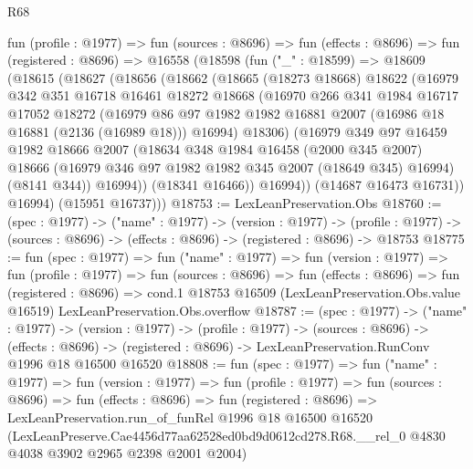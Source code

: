 \begin{lexlean}{R68}
\begin{coremodule}
  fun (profile : @1977) =>
  fun (sources : @8696) =>
  fun (effects : @8696) =>
  fun (registered : @8696) =>
  @16558
    (@18598
      (fun ("_" : @18599) =>
      @18609
        (@18615
          (@18627
            (@18656
              (@18662
                (@18665
                  (@18273 @18668)
                  @18622
                  (@16979
                    @342
                    @351
                    @16718
                    @16461
                    @18272
                    @18668
                    (@16970
                      @266
                      @341
                      @1984
                      @16717
                      @17052
                      @18272
                      (@16979
                        @86
                        @97
                        @1982
                        @1982
                        @16881
                        @2007
                        (@16986 @18 @16881 (@2136 (@16989 @18)))
                        @16994)
                      @18306)
                    (@16979
                      @349
                      @97
                      @16459
                      @1982
                      @18666
                      @2007
                      (@18634
                        @348
                        @1984
                        @16458
                        (@2000 @345 @2007)
                        @18666
                        (@16979 @346 @97 @1982 @1982 @345 @2007 (@18649 @345) @16994)
                        (@8141 @344))
                      @16994))
                  (@18341 @16466))
                @16994))
            (@14687 @16473 @16731))
          @16994)
        (@15951 @16737)))
@18753 := LexLeanPreservation.Obs
@18760 := (spec : @1977) ->
  ("name" : @1977) ->
  (version : @1977) ->
  (profile : @1977) -> (sources : @8696) -> (effects : @8696) -> (registered : @8696) -> @18753
@18775 := fun (spec : @1977) =>
  fun ("name" : @1977) =>
  fun (version : @1977) =>
  fun (profile : @1977) =>
  fun (sources : @8696) =>
  fun (effects : @8696) =>
  fun (registered : @8696) =>
  cond.{1} @18753 @16509 (LexLeanPreservation.Obs.value @16519) LexLeanPreservation.Obs.overflow
@18787 := (spec : @1977) ->
  ("name" : @1977) ->
  (version : @1977) ->
  (profile : @1977) ->
  (sources : @8696) ->
  (effects : @8696) -> (registered : @8696) -> LexLeanPreservation.RunConv @1996 @18 @16500 @16520
@18808 := fun (spec : @1977) =>
  fun ("name" : @1977) =>
  fun (version : @1977) =>
  fun (profile : @1977) =>
  fun (sources : @8696) =>
  fun (effects : @8696) =>
  fun (registered : @8696) =>
  LexLeanPreservation.run_of_funRel
    @1996
    @18
    @16500
    @16520
    (LexLeanPreserve.Cae4456d77aa62528ed0bd9d0612cd278.R68.__rel_0
      @4830
      @4038
      @3902
      @2965
      @2398
      @2001
      @2004)
\end{coremodule}
\end{lexlean}
